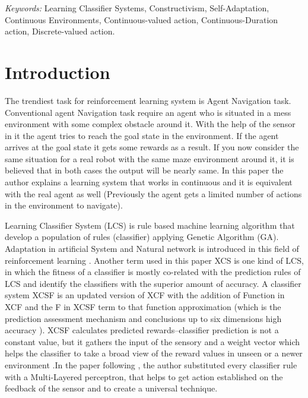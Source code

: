 \documentclass[12pt]{article}
\begin{document}
\noindent%
{\it Keywords:} Learning Classifier Systems, Constructivism, Self-Adaptation, Continuous Environments, Continuous-valued action, Continuous-Duration action, Discrete-valued action.
\vfill

\newpage
\spacingset{} %
\section{Introduction}
\label{sec:intro}

The trendiest task for reinforcement learning system is Agent Navigation task. Conventional agent Navigation task require an agent who is situated in a mess environment with some complex obstacle around it. With the help of the sensor in it the agent tries to reach the goal state in the environment. If the agent arrives at the goal state it gets some rewards as a result. If you now consider the same situation for a real robot with the same maze environment around it, it is believed that in both cases the output will be nearly same. In this paper the author explains a learning system that works in continuous and it is equivalent with the real agent as well (Previously the agent gets a limited number of actions in the environment to navigate).

Learning Classifier System (LCS) \cite{WilsonPrediction2001FunctionAW} is rule based machine learning algorithm that develop a population of rules (classifier) applying Genetic Algorithm (GA). Adaptation in artificial System and Natural network is introduced in this field of reinforcement learning . Another term used in this paper XCS is one kind of LCS, in which the fitness of a classifier is mostly co-related with the prediction rules of LCS and identify the classifiers with the superior amount of accuracy. A classifier system XCSF is an updated version of XCF with the addition of Function in XCF and the F in XCSF term to that function approximation (which is the prediction assessment mechanism and conclusions up to six dimensions high accuracy \cite{WilsonPrediction2001FunctionAW}). XCSF calculates predicted rewards–classifier prediction is not a constant value, but it gathers the input of the sensory and a weight vector which helps the classifier to take a broad view of the reward values in unseen or a newer environment \cite{WilsonPrediction2001FunctionAW}.In the paper following \cite{10.1007/3-540-45712-7_54}, the author substituted every classifier rule with a Multi-Layered perceptron, that helps to get action established on the feedback of the sensor and to create a universal technique. 
\end{document}
